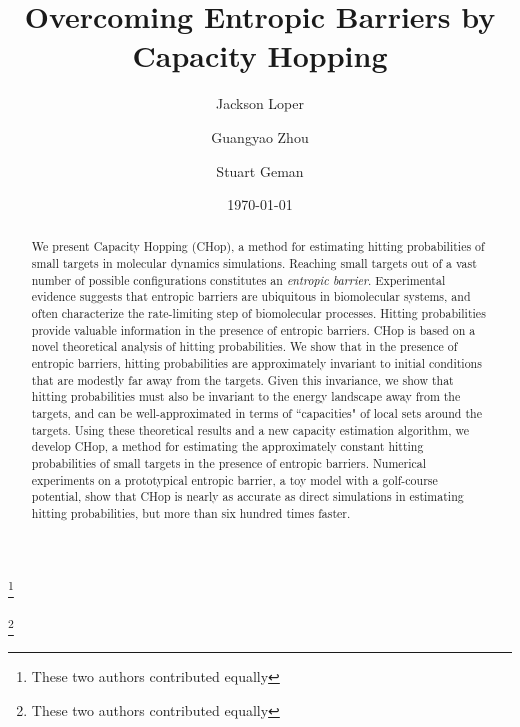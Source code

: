\documentclass[english, aip, jcp, priprint, graphicx,floatfix]{revtex4-1}
\theoremstyle{plain}
\theoremstyle{definition}
\theoremstyle{plain}
\begin{document}
\title{Overcoming Entropic Barriers by Capacity Hopping} %

\author{Jackson Loper}
\thanks{These two authors contributed equally}

\author{Guangyao Zhou}
\thanks{These two authors contributed equally}

\author{Stuart Geman}

\date{\today}

\begin{abstract}
	We present Capacity Hopping (CHop), a method for estimating hitting probabilities of small targets in molecular dynamics simulations. Reaching small targets out of a vast number of possible configurations constitutes an \emph{entropic barrier}. Experimental evidence suggests that entropic barriers are ubiquitous in biomolecular systems, and often characterize the rate-limiting step of biomolecular processes. Hitting probabilities provide valuable information in the presence of entropic barriers. CHop is based on a novel theoretical analysis of hitting probabilities. We show that in the presence of entropic barriers, hitting probabilities are approximately invariant to initial conditions that are modestly far away from the targets.  Given this invariance, we show that hitting probabilities must also be invariant to the energy landscape away from the targets, and can be well-approximated in terms of ``capacities" of local sets around the targets.  Using these theoretical results and a new capacity estimation algorithm, we develop CHop, a method for estimating the approximately constant hitting probabilities of small targets in the presence of entropic barriers. Numerical experiments on a prototypical entropic barrier, a toy model with a golf-course potential, show that CHop is nearly as accurate as direct simulations in estimating hitting probabilities, but more than six hundred times faster.
\end{abstract}

\pacs{}%

\maketitle %
\end{document}
